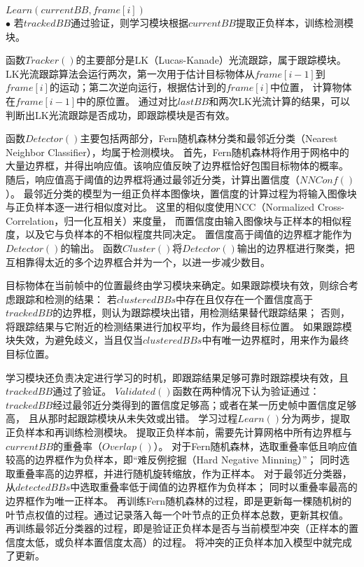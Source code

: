 \begin{algorithm}[htbp]
\begin{algorithmic}[1]
    \STATE $ Learn( currentBB, frame[i] )  $
    \ENDIF
    \\ $\bullet$ 若$trackedBB$通过验证，则学习模块根据$currentBB$提取正负样本，训练检测模块。
  \end{algorithmic}
\end{algorithm}

函数$Tracker()$的主要部分是LK（Lucas-Kanade）光流跟踪，属于跟踪模块。
LK光流跟踪算法会运行两次，第一次用于估计目标物体从$frame[i-1]$到$frame[i]$的运动；第二次逆向运行，根据估计到的$frame[i]$中位置，
计算物体在$frame[i-1]$中的原位置。
通过对比$lastBB$和两次LK光流计算的结果，可以判断出LK光流跟踪是否成功，即跟踪模块是否有效。


函数$Detector()$主要包括两部分，Fern随机森林分类和最邻近分类（Nearest Neighbor Classifier），均属于检测模块。
首先，Fern随机森林将作用于网格中的大量边界框，并得出响应值。该响应值反映了边界框恰好包围目标物体的概率。
随后，响应值高于阈值的边界框将通过最邻近分类，计算出置信度（$NNConf()$）。
最邻近分类的模型为一组正负样本图像块，置信度的计算过程为将输入图像块与正负样本逐一进行相似度对比。
这里的相似度使用NCC（Normalized Cross-Correlation，归一化互相关）来度量，
而置信度由输入图像块与正样本的相似程度，以及它与负样本的不相似程度共同决定。
置信度高于阈值的边界框才能作为$Detector()$的输出。
函数$Cluster()$将$Detector()$输出的边界框进行聚类，把互相靠得太近的多个边界框合并为一个，以进一步减少数目。

目标物体在当前帧中的位置最终由学习模块来确定。如果跟踪模块有效，则综合考虑跟踪和检测的结果：
若$clusteredBBs$中存在且仅存在一个置信度高于$trackedBB$的边界框，则认为跟踪模块出错，用检测结果替代跟踪结果；
否则，将跟踪结果与它附近的检测结果进行加权平均，作为最终目标位置。
如果跟踪模块失效，为避免歧义，当且仅当$clusteredBBs$中有唯一边界框时，用来作为最终目标位置。

学习模块还负责决定进行学习的时机，即跟踪结果足够可靠时\pozhehao 跟踪模块有效，且$trackedBB$通过了验证。
$Validated()$函数在两种情况下认为验证通过：$trackedBB$经过最邻近分类得到的置信度足够高；或者在某一历史帧中置信度足够高，
且从那时起跟踪模块从未失效或出错。
学习过程$Learn()$分为两步，提取正负样本和再训练检测模块。
提取正负样本前，需要先计算网格中所有边界框与$currentBB$的重叠率（$Overlap()$）。
对于Fern随机森林，选取重叠率低且响应值较高的边界框作为负样本，即``难反例挖掘（Hard Negative Minning）''；
同时选取重叠率高的边界框，并进行随机旋转缩放，作为正样本。
对于最邻近分类器，从$detectedBBs$中选取重叠率低于阈值的边界框作为负样本；
同时以重叠率最高的边界框作为唯一正样本。
再训练Fern随机森林的过程，即是更新每一棵随机树的叶节点权值的过程。通过记录落入每一个叶节点的正负样本总数，更新其权值。
再训练最邻近分类器的过程，即是验证正负样本是否与当前模型冲突（正样本的置信度太低，或负样本置信度太高）的过程。
将冲突的正负样本加入模型中就完成了更新。

